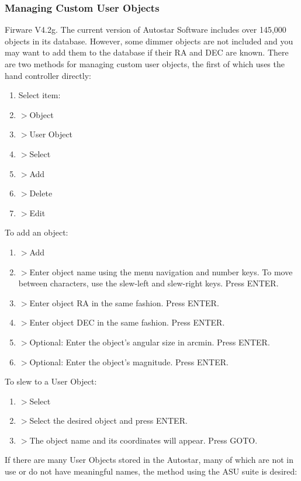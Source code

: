 \documentclass[12pt,titlepage]{article}
\begin{document}
\subsubsection{Managing Custom User Objects}
Firware V4.2g.
The current version of Autostar Software includes over 145,000 objects in its database.
However, some dimmer objects are not included and you may want to add them to the database if their RA and DEC are known.
There are two methods for managing custom user objects, the first of which uses the hand controller directly:
\begin{enumerate}
	\item[] Select item:
	\item[]\quad $>$Object
	\item[]\quad\quad $>$User Object
	\item[]\quad\quad\quad $>$Select
	\item[]\quad\quad\quad $>$Add
	\item[]\quad\quad\quad $>$Delete
	\item[]\quad\quad\quad $>$Edit
\end{enumerate}
To add an object:
\begin{enumerate}
	\item[]\quad\quad\quad $>$Add
	\item[]\quad\quad\quad\quad $>$Enter object name using the menu navigation and number keys. To move between characters, use the slew-left and slew-right keys. Press ENTER.
	\item[]\quad\quad\quad\quad $>$Enter object RA in the same fashion. Press ENTER. 
	\item[]\quad\quad\quad\quad $>$Enter object DEC in the same fashion. Press ENTER.
	\item[]\quad\quad\quad\quad $>$Optional: Enter the object's angular size in arcmin. Press ENTER.
	\item[]\quad\quad\quad\quad $>$Optional: Enter the object's magnitude. Press ENTER.
\end{enumerate}
To slew to a User Object:
\begin{enumerate}
	\item[]\quad\quad\quad $>$Select
	\item[]\quad\quad\quad\quad $>$Select the desired object and press ENTER.
	\item[]\quad\quad\quad\quad $>$The object name and its coordinates will appear. Press GOTO.
\end{enumerate}
If there are many User Objects stored in the Autostar, many of which are not in use or do not have meaningful names, the method using the ASU suite is desired:
\end{document}
